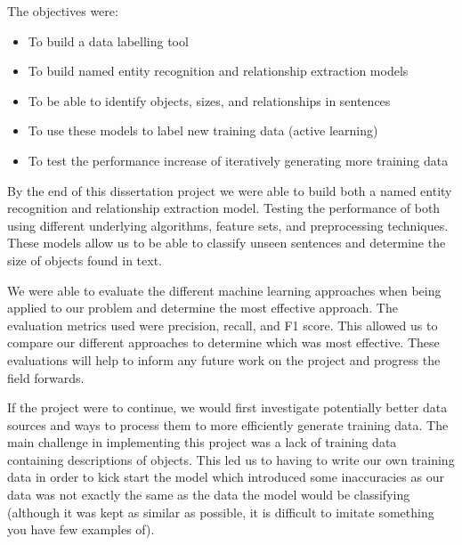 \documentclass[11pt,oneside]{book}
\begin{document}
\noindent The objectives were:

\begin{itemize}
\item To build a data labelling tool
\item To build named entity recognition and relationship extraction models
\item To be able to identify objects, sizes, and relationships in sentences
\item To use these models to label new training data (active learning)
\item To test the performance increase of iteratively generating more training data
\end{itemize}

By the end of this dissertation project we were able to build both a named entity recognition and relationship extraction model. Testing the performance of both using different underlying algorithms, feature sets, and preprocessing techniques. These models allow us to be able to classify unseen sentences and determine the size of objects found in text.

We were able to evaluate the different machine learning approaches when being applied to our problem and determine the most effective approach. The evaluation metrics used were precision, recall, and F1 score. This allowed us to compare our different approaches to determine which was most effective. These evaluations will help to inform any future work on the project and progress the field forwards.

If the project were to continue, we would first investigate potentially better data sources and ways to process them to more efficiently generate training data. The main challenge in implementing this project was a lack of training data containing descriptions of objects. This led us to having to write our own training data in order to kick start the model which introduced some inaccuracies as our data was not exactly the same as the data the model would be classifying (although it was kept as similar as possible, it is difficult to imitate something you have few examples of).


 
 



\begin{appendices}

\end{appendices}
\end{document}
